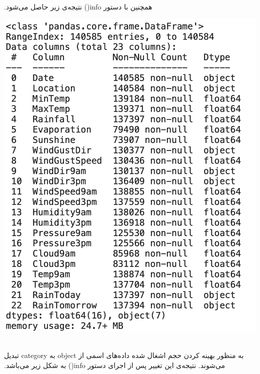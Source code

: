‫
‫همچنین با دستور info() نتیجه‌ی زیر حاصل می‌شود.
‫
‫\begin{center}
‫\includegraphics[scale=0.35]{figs/Screenshot 1403-01-22 at 23.56.52.png}
‫\end{center}
‫
‫به منظور بهینه کردن حجم اشغال شده داده‌های اسمی از object به category تبدیل می‌شوند. نتیجه‌ی این تغییر پس از اجرای دستور info() به شکل زیر می‌باشد.

